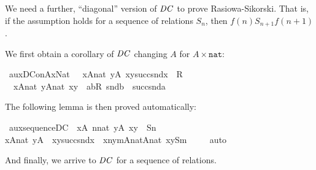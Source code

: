 We need a further, ``diagonal'' version of $\mathit{DC}$  to prove
Rasiowa-Sikorski. That is, if the assumption holds for a sequence of
relations $S_n$,  then $f(n) \mathrel{S_{n+1}} f(n+1)$.

We first obtain a corollary of $\mathit{DC}$ changing $A$ for
$A\times\mathtt{nat}$:

\begin{isabelle}
\isamarkupfalse%
\ aux{\isacharunderscore}DC{\isacharunderscore}on{\isacharunderscore}AxNat{}\ {\isacharcolon}\isanewline \ \ {\isachardoublequoteopen}{\isasymforall}x{\isasymin}A{\isasymtimes}nat{\isachardot}\ {\isasymexists}y{\isasymin}A{\isachardot}\ {\isasymlangle}x{\isacharcomma}{\isasymlangle}y{\isacharcomma}succ{\isacharparenleft}snd{\isacharparenleft}x{\isacharparenright}{\isacharparenright}{\isasymrangle}{\isasymrangle}\ {\isasymin}\ R\ {\isasymLongrightarrow}\isanewline
    \ \ {\isasymforall}x{\isasymin}A{\isasymtimes}nat{\isachardot}\ {\isasymexists}y{\isasymin}A{\isasymtimes}nat{\isachardot}\ {\isasymlangle}x{\isacharcomma}y{\isasymrangle}\ {\isasymin}\ {\isacharbraceleft}{\isasymlangle}a{\isacharcomma}b{\isasymrangle}{\isasymin}R{\isachardot}\ snd{\isacharparenleft}b{\isacharparenright}\ {\isacharequal}\ succ{\isacharparenleft}snd{\isacharparenleft}a{\isacharparenright}{\isacharparenright}{\isacharbraceright}{\isachardoublequoteclose}
\end{isabelle}
%
The following lemma is then proved automatically:

\begin{isabelle}
\isamarkupfalse%
\ aux{\isacharunderscore}sequence{\isacharunderscore}DC{}\ {\isacharcolon}\ {\isachardoublequoteopen}{\isasymforall}x{\isasymin}A{\isachardot}\ {\isasymforall}n{\isasymin}nat{\isachardot}\ {\isasymexists}y{\isasymin}A{\isachardot}\ {\isasymlangle}x{\isacharcomma}y{\isasymrangle}\ {\isasymin}\ S{\isacharbackquote}n\ {\isasymLongrightarrow}\isanewline
  {\isasymforall}x{\isasymin}A{\isasymtimes}nat{\isachardot}\ {\isasymexists}y{\isasymin}A{\isachardot}\isanewline \ \ {\isasymlangle}x{\isacharcomma}{\isasymlangle}y{\isacharcomma}succ{\isacharparenleft}snd{\isacharparenleft}x{\isacharparenright}{\isacharparenright}{\isasymrangle}{\isasymrangle}\ {\isasymin}\ {\isacharbraceleft}{\isasymlangle}{\isasymlangle}x{\isacharcomma}n{\isasymrangle}{\isacharcomma}{\isasymlangle}y{\isacharcomma}m{\isasymrangle}{\isasymrangle}{\isasymin}{\isacharparenleft}A{\isasymtimes}nat{\isacharparenright}{\isasymtimes}{\isacharparenleft}A{\isasymtimes}nat{\isacharparenright}{\isachardot}\ {\isasymlangle}x{\isacharcomma}y{\isasymrangle}{\isasymin}S{\isacharbackquote}m\ {\isacharbraceright}{\isachardoublequoteclose}\isanewline
\ \ %
\isamarkupfalse%
\ auto%
\end{isabelle}
%
And finally, we arrive to $\mathit{DC}$ for a sequence of relations.

